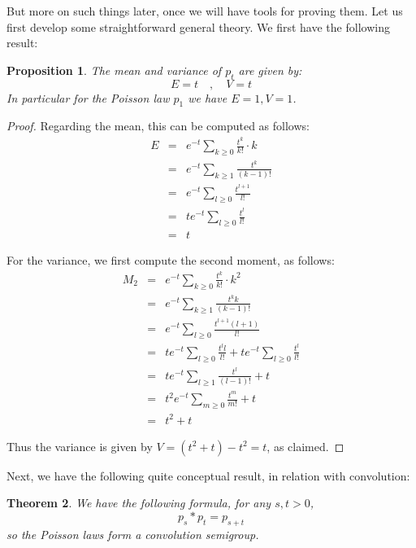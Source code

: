\documentclass[12pt]{amsbook}
\newtheorem{theorem}{Theorem}[chapter]
\newtheorem{proposition}[theorem]{Proposition}
\begin{document}
But more on such things later, once we will have tools for proving them. Let us first develop some straightforward general theory. We first have the following result:


\begin{proposition}
The mean and variance of $p_t$ are given by:
$$E=t\quad,\quad V=t$$
In particular for the Poisson law $p_1$ we have $E=1,V=1$.
\end{proposition}

\begin{proof}
Regarding the mean, this can be computed as follows:
\begin{eqnarray*}
E
&=&e^{-t}\sum_{k\geq0}\frac{t^k}{k!}\cdot k\\
&=&e^{-t}\sum_{k\geq1}\frac{t^k}{(k-1)!}\\
&=&e^{-t}\sum_{l\geq0}\frac{t^{l+1}}{l!}\\
&=&te^{-t}\sum_{l\geq0}\frac{t^l}{l!}\\
&=&t
\end{eqnarray*}

For the variance, we first compute the second moment, as follows:
\begin{eqnarray*}
M_2
&=&e^{-t}\sum_{k\geq0}\frac{t^k}{k!}\cdot k^2\\
&=&e^{-t}\sum_{k\geq1}\frac{t^kk}{(k-1)!}\\
&=&e^{-t}\sum_{l\geq0}\frac{t^{l+1}(l+1)}{l!}\\
&=&te^{-t}\sum_{l\geq0}\frac{t^ll}{l!}+te^{-t}\sum_{l\geq0}\frac{t^l}{l!}\\
&=&te^{-t}\sum_{l\geq1}\frac{t^l}{(l-1)!}+t\\
&=&t^2e^{-t}\sum_{m\geq0}\frac{t^m}{m!}+t\\
&=&t^2+t
\end{eqnarray*}

Thus the variance is given by $V=(t^2+t)-t^2=t$, as claimed.
\end{proof}

Next, we have the following quite conceptual result, in relation with convolution:


\begin{theorem}
We have the following formula, for any $s,t>0$,
$$p_s*p_t=p_{s+t}$$
so the Poisson laws form a convolution semigroup.
\end{theorem}
\end{document}
